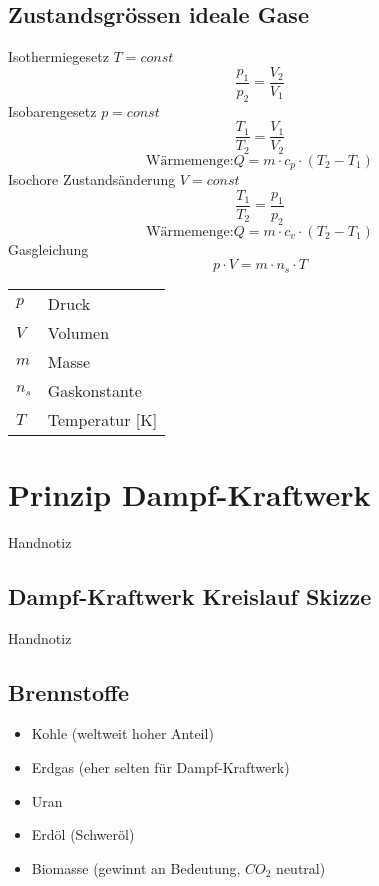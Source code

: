 \documentclass[a4,paper,fleqn]{article}
\begin{document}
\subsection{Zustandsgrössen ideale Gase}
Isothermiegesetz $T=const$
\[ \frac{p_1}{p_2} = \frac{V_2}{V_1} \]
Isobarengesetz $p=const$
\[ \frac{T_1}{T_2} = \frac{V_1}{V_2} \]
\[ \text{Wärmemenge:} Q = m \cdot c_p \cdot (T_2 - T_1) \]
Isochore Zustandsänderung $V=const$
\[ \frac{T_1}{T_2} = \frac{p_1}{p_2} \]
\[ \text{Wärmemenge:} Q = m \cdot c_v \cdot (T_2 - T_1) \]
Gasgleichung
\[ p \cdot V = m \cdot n_s \cdot T \]
\begin{tabular}{@{}l@{$=$}l}
    $p  $ & Druck \\
    $V  $ & Volumen \\
    $m  $ & Masse \\
    $n_s$ & Gaskonstante \\
    $T  $ & Temperatur [K] \\
\end{tabular}

\section{Prinzip Dampf-Kraftwerk}
Handnotiz

\subsection{Dampf-Kraftwerk Kreislauf Skizze}
Handnotiz

\subsection{Brennstoffe}
\begin{itemize}
    \item Kohle (weltweit hoher Anteil)
    \item Erdgas (eher selten für Dampf-Kraftwerk)
    \item Uran
    \item Erdöl (Schweröl)
    \item Biomasse (gewinnt an Bedeutung, $CO_2$ neutral)
\end{itemize}
\end{document}
